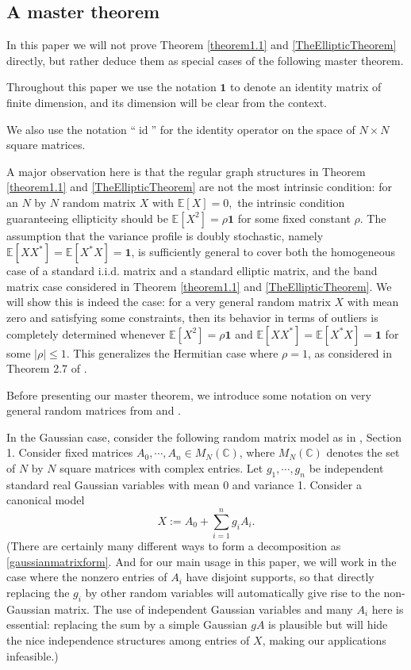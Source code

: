 \documentclass[11pt,reqno]{amsart}
\theoremstyle{plain}
\theoremstyle{remark}
\numberwithin{equation}{section}
\begin{document}
\subsection{A master theorem}\label{section247}

In this paper we will not prove Theorem \ref{theorem1.1} and \ref{TheEllipticTheorem} directly, but rather deduce them as special cases of the following master theorem. 

Throughout this paper we use the notation $\mathbf{1}$ to denote an identity matrix of finite dimension, and its dimension will be clear from the context.

We also use the notation “$\operatorname{id}$” for the identity operator on the space of $N\times N$ square matrices.

A major observation here is that the regular graph structures in Theorem \ref{theorem1.1} and \ref{TheEllipticTheorem} are not the most intrinsic condition: for an $N$ by $N$ random matrix $X$ with $\mathbb{E}[X]=0,$ the intrinsic condition guaranteeing ellipticity should be 
$\mathbb{E}[X^2]=\rho \mathbf{1}$ for some fixed constant $\rho$. The assumption that the variance profile is doubly stochastic, namely $\mathbb{E}[XX^*]=\mathbb{E}[X^*X]=\mathbf{1}$, is sufficiently general to cover both the homogeneous case of a standard i.i.d. matrix and a standard elliptic matrix, and the band matrix case considered in Theorem \ref{theorem1.1} and \ref{TheEllipticTheorem}. We will show this is indeed the case: for a very general random matrix $X$ with mean zero and satisfying some constraints, then its behavior in terms of outliers is completely determined whenever $\mathbb{E}[X^2]=\rho \mathbf{1}$ and $\mathbb{E}[XX^*]=\mathbb{E}[X^*X]=\mathbf{1}$ for some $|\rho|\leq 1$. This generalizes the Hermitian case where $\rho=1$, as considered in Theorem 2.7 of \cite{bandeira2024matrix}.

Before presenting our master theorem, we introduce some notation on very general random matrices from \cite{bandeira2023matrix} and \cite{brailovskaya2022universality}. 


In the Gaussian case, consider the following random matrix model as in \cite{bandeira2023matrix}, Section 1. Consider fixed matrices $A_0,\cdots,A_n\in M_N(\mathbb{C})$, where $M_N(\mathbb{C})$ denotes the set of $N$ by $N$ square matrices with complex entries. Let $g_1,\cdots,g_n$ be independent standard real Gaussian variables with mean 0 and variance 1. Consider a canonical model \begin{equation}\label{gaussianmatrixform}
    X:=A_0+\sum_{i=1}^n g_i A_i. 
\end{equation} (There are certainly many different ways to form a decomposition as \eqref{gaussianmatrixform}. And for our main usage in this paper, we will work in the case where the nonzero entries of $A_i$ have disjoint supports, so that directly replacing the $g_i$ by other random variables will automatically give rise to the non-Gaussian matrix. The use of independent Gaussian variables and many $A_i$ here is essential: replacing the sum by a simple Gaussian $gA$ is plausible but will hide the nice independence structures among entries of $X$, making our applications infeasible.)
\end{document}
